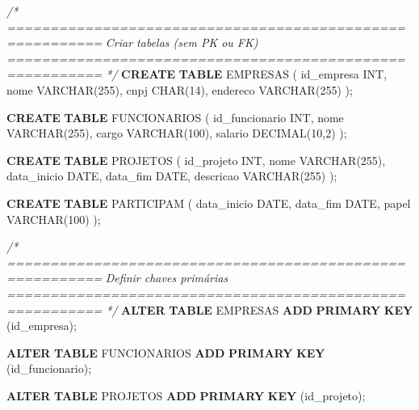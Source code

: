 \documentclass[
]{book}
\newenvironment{Shaded}{\begin{snugshade}}{\end{snugshade}}
\newcommand{\CommentTok}[1]{\textcolor[rgb]{0.56,0.35,0.01}{\textit{#1}}}
\newcommand{\DataTypeTok}[1]{\textcolor[rgb]{0.13,0.29,0.53}{#1}}
\newcommand{\DecValTok}[1]{\textcolor[rgb]{0.00,0.00,0.81}{#1}}
\newcommand{\KeywordTok}[1]{\textcolor[rgb]{0.13,0.29,0.53}{\textbf{#1}}}
\newcommand{\NormalTok}[1]{#1}
\begin{document}
\begin{Shaded}
\begin{Highlighting}[]
\CommentTok{/* =========================================================}
\CommentTok{   Criar tabelas (sem PK ou FK)}
\CommentTok{   ========================================================= */}
\KeywordTok{CREATE} \KeywordTok{TABLE}\NormalTok{ EMPRESAS (}
\NormalTok{    id\_empresa }\DataTypeTok{INT}\NormalTok{,}
\NormalTok{    nome }\DataTypeTok{VARCHAR}\NormalTok{(}\DecValTok{255}\NormalTok{),}
\NormalTok{    cnpj }\DataTypeTok{CHAR}\NormalTok{(}\DecValTok{14}\NormalTok{),}
\NormalTok{    endereco }\DataTypeTok{VARCHAR}\NormalTok{(}\DecValTok{255}\NormalTok{)}
\NormalTok{);}

\KeywordTok{CREATE} \KeywordTok{TABLE}\NormalTok{ FUNCIONARIOS (}
\NormalTok{    id\_funcionario }\DataTypeTok{INT}\NormalTok{,}
\NormalTok{    nome }\DataTypeTok{VARCHAR}\NormalTok{(}\DecValTok{255}\NormalTok{),}
\NormalTok{    cargo }\DataTypeTok{VARCHAR}\NormalTok{(}\DecValTok{100}\NormalTok{),}
\NormalTok{    salario }\DataTypeTok{DECIMAL}\NormalTok{(}\DecValTok{10}\NormalTok{,}\DecValTok{2}\NormalTok{)}
\NormalTok{);}

\KeywordTok{CREATE} \KeywordTok{TABLE}\NormalTok{ PROJETOS (}
\NormalTok{    id\_projeto }\DataTypeTok{INT}\NormalTok{,}
\NormalTok{    nome }\DataTypeTok{VARCHAR}\NormalTok{(}\DecValTok{255}\NormalTok{),}
\NormalTok{    data\_inicio }\DataTypeTok{DATE}\NormalTok{,}
\NormalTok{    data\_fim }\DataTypeTok{DATE}\NormalTok{,}
\NormalTok{    descricao }\DataTypeTok{VARCHAR}\NormalTok{(}\DecValTok{255}\NormalTok{)}
\NormalTok{);}

\KeywordTok{CREATE} \KeywordTok{TABLE}\NormalTok{ PARTICIPAM (}
\NormalTok{    data\_inicio }\DataTypeTok{DATE}\NormalTok{,}
\NormalTok{    data\_fim }\DataTypeTok{DATE}\NormalTok{,}
\NormalTok{    papel }\DataTypeTok{VARCHAR}\NormalTok{(}\DecValTok{100}\NormalTok{)}
\NormalTok{);}

\CommentTok{/* =========================================================}
\CommentTok{   Definir chaves primárias}
\CommentTok{   ========================================================= */}
\KeywordTok{ALTER} \KeywordTok{TABLE}\NormalTok{ EMPRESAS }\KeywordTok{ADD} \KeywordTok{PRIMARY} \KeywordTok{KEY}\NormalTok{ (id\_empresa);}

\KeywordTok{ALTER} \KeywordTok{TABLE}\NormalTok{ FUNCIONARIOS }\KeywordTok{ADD} \KeywordTok{PRIMARY} \KeywordTok{KEY}\NormalTok{ (id\_funcionario);}

\KeywordTok{ALTER} \KeywordTok{TABLE}\NormalTok{ PROJETOS }\KeywordTok{ADD} \KeywordTok{PRIMARY} \KeywordTok{KEY}\NormalTok{ (id\_projeto);}


\end{Highlighting}
\end{Shaded}
\end{document}

